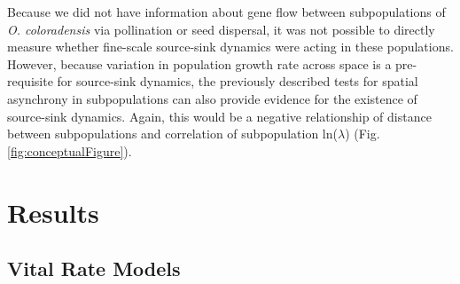 \documentclass[12pt, letterpaper]{article}
\begin{document}
Because we did not have information about gene flow between subpopulations of \textit{O. coloradensis} via pollination or seed dispersal, it was not possible to directly measure whether fine-scale source-sink dynamics were acting in these populations. However, because variation in population growth rate across space is a pre-requisite for source-sink dynamics, the previously described tests for spatial asynchrony in subpopulations can also provide evidence for the existence of source-sink dynamics. Again, this would be a negative relationship of distance between subpopulations and correlation of subpopulation ln($\lambda$) (Fig. \ref{fig:conceptualFigure}).  


 
\section{Results}

\subsection{Vital Rate Models} 
\end{document}
